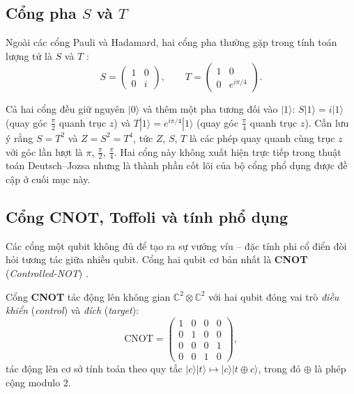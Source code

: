 \subsection*{Cổng pha $S$ và $T$}

Ngoài các cổng Pauli và Hadamard, hai cổng pha thường gặp trong tính toán lượng
tử là $S$ và $T$ \cite{ref5}:
$$S = \begin{pmatrix}1&0\\0&i\end{pmatrix}, \qquad
  T = \begin{pmatrix}1&0\\0&e^{i\pi/4}\end{pmatrix}.$$

\begin{remark}
Cả hai cổng đều giữ nguyên $|0\rangle$ và thêm một pha tương đối vào $|1\rangle$:
$S|1\rangle = i|1\rangle$ (quay góc $\frac{\pi}{2}$ quanh trục $z$) và
$T|1\rangle = e^{i\pi/4}|1\rangle$ (quay góc $\frac{\pi}{4}$ quanh trục $z$). Cần lưu ý
rằng $S = T^2$ và $Z = S^2 = T^4$, tức $Z$, $S$, $T$ là các phép quay quanh
cùng trục $z$ với góc lần lượt là $\pi$, $\frac{\pi}{2}$, $\frac{\pi}{4}$. Hai cổng này không
xuất hiện trực tiếp trong thuật toán Deutsch--Jozsa nhưng là thành phần cốt lõi
của bộ cổng phổ dụng được đề cập ở cuối mục này.
\end{remark}

\subsection*{Cổng CNOT, Toffoli và tính phổ dụng}

Các cổng một qubit không đủ để tạo ra sự vướng víu -- đặc tính phi cổ điển đòi
hỏi tương tác giữa nhiều qubit. Cổng hai qubit cơ bản nhất là
\textbf{CNOT} (\textit{Controlled-NOT}) \cite{ref5}.

\begin{definition}
\label{def:cnot}
Cổng \textbf{CNOT} tác động lên không gian $\mathbb{C}^2 \otimes \mathbb{C}^2$
với hai qubit đóng vai trò \emph{điều khiển} (\textit{control}) và \emph{đích}
(\textit{target}):
$$\mathrm{CNOT} =
\begin{pmatrix}1&0&0&0\\0&1&0&0\\0&0&0&1\\0&0&1&0\end{pmatrix},$$
tác động lên cơ sở tính toán theo quy tắc
$|c\rangle|t\rangle \mapsto |c\rangle|t \oplus c\rangle$,
trong đó $\oplus$ là phép cộng modulo $2$.
\end{definition}

